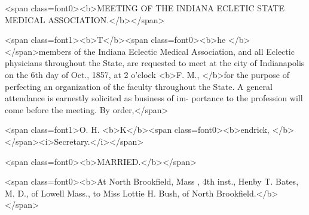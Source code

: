 <span class=font0><b>MEETING OF THE INDIANA ECLETIC STATE MEDICAL ASSOCIATION.</b></span>

<span class=font1><b>T</b><span class=font0><b>he </b></span>members of the Indiana Eclectic Medical Association, and all
Eclectic physicians throughout the State, are requested to meet at the
city of Indianapolis on the 6th day of Oct., 1857, at 2 o'clock <b>F. M.,
</b>for the purpose of perfecting an organization of the faculty throughout
the State. A general attendance is earnestly solicited as business of im-
portance to the profession will come before the meeting.   By order,</span>

<span class=font1>O. H. <b>K</b><span class=font0><b>endrick, </b></span><i>Secretary.</i></span>

<span class=font0><b>MARRIED.</b></span>

<span class=font0><b>At North Brookfield, Mass , 4th inst., Henby T. Bates, M. D., of Lowell Mass., to Miss
Lottie H. Bush, of North Brookfield.</b></span>
